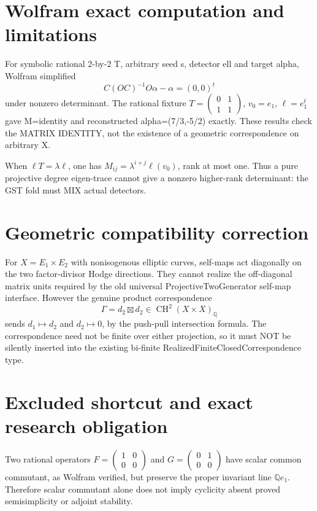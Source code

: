 \documentclass[11pt]{article}
\newcommand{\Q}{\mathbb Q}
\newcommand{\CH}{\operatorname{CH}}
\begin{document}
\section{Wolfram exact computation and limitations}
For symbolic rational 2-by-2 T, arbitrary seed s, detector ell
and target alpha, Wolfram simplified
\[
 C(OC)^{-1}O\alpha-\alpha=(0,0)^t
\]
under nonzero determinant. The rational fixture
\(T=\left(\begin{smallmatrix}0&1\\1&1\end{smallmatrix}\right)\),
\(v_0=e_1\), \(\ell=e_1^t\) gave M=identity and
reconstructed alpha=(7/3,-5/2) exactly.
These results check the MATRIX IDENTITY, not the existence of a
geometric correspondence on arbitrary X.

When \(\ell T=\lambda\ell\), one has
\(M_{ij}=\lambda^{i+j}\ell(v_0)\), rank at most one.
Thus a pure projective degree eigen-trace cannot give a nonzero
higher-rank determinant: the GST fold must MIX actual detectors.

\section{Geometric compatibility correction}
For \(X=E_1\times E_2\) with nonisogenous elliptic curves,
self-maps act diagonally on the two factor-divisor Hodge directions.
They cannot realize the off-diagonal matrix units required by the
old universal ProjectiveTwoGenerator self-map interface.
However the genuine product correspondence
\[
\Gamma=d_2\boxtimes d_2\in\CH^2(X\times X)_\Q
\]
sends \(d_1\mapsto d_2\) and \(d_2\mapsto0\), by the
push-pull intersection formula. The correspondence need not be
finite over either projection, so it must NOT be silently inserted
into the existing bi-finite RealizedFiniteClosedCorrespondence type.

\section{Excluded shortcut and exact research obligation}
Two rational operators
\(F=\left(\begin{smallmatrix}1&0\\0&0\end{smallmatrix}\right)\)
and \(G=\left(\begin{smallmatrix}0&1\\0&0\end{smallmatrix}\right)\)
have scalar common commutant, as Wolfram verified, but preserve
the proper invariant line \(\Q e_1\). Therefore scalar commutant
alone does not imply cyclicity absent proved semisimplicity or
adjoint stability.
\end{document}
